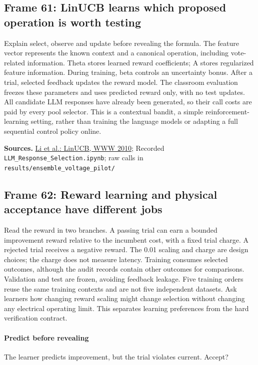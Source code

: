 \documentclass[11pt]{article}
\begin{document}
\subsection*{Frame 61: LinUCB learns which proposed operation is worth testing}
Explain select, observe and update before revealing the formula. The feature vector represents the known context and a canonical operation, including vote-related information. Theta stores learned reward coefficients; A stores regularized feature information. During training, beta controls an uncertainty bonus. After a trial, selected feedback updates the reward model. The classroom evaluation freezes these parameters and uses predicted reward only, with no test updates. All candidate LLM responses have already been generated, so their call costs are paid by every pool selector. This is a contextual bandit, a simple reinforcement-learning setting, rather than training the language models or adapting a full sequential control policy online.\par
\par\nopagebreak\begin{minipage}{\linewidth}{\footnotesize\color{slate}\textbf{Sources.} \href{https://arxiv.org/abs/1003.0146}{Li et al.: LinUCB, WWW 2010}; Recorded \texttt{LLM\_Response\_Selection.ipynb}; raw calls in \texttt{results/ensemble\_voltage\_pilot/}\par}\end{minipage}\par\medskip
\subsection*{Frame 62: Reward learning and physical acceptance have different jobs}
Read the reward in two branches. A passing trial can earn a bounded improvement reward relative to the incumbent cost, with a fixed trial charge. A rejected trial receives a negative reward. The 0.01 scaling and charge are design choices; the charge does not measure latency. Training consumes selected outcomes, although the audit records contain other outcomes for comparisons. Validation and test are frozen, avoiding feedback leakage. Five training orders reuse the same training contexts and are not five independent datasets. Ask learners how changing reward scaling might change selection without changing any electrical operating limit. This separates learning preferences from the hard verification contract.\par
\paragraph{Predict before revealing}The learner predicts improvement, but the trial violates current. Accept?
\end{document}
